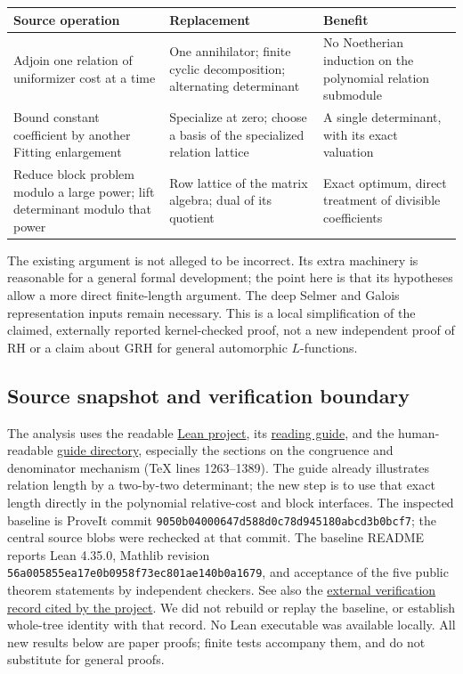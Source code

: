 \documentclass[11pt]{article}
\theoremstyle{remark}\newtheorem{remark}[theorem]{Remark}
\newcommand{\baseurl}{https://github.com/VladimirReshetnikov/ProveIt/tree/9050b04000647d588d0c78d945180abcd3b0bcf7/Analysis/GeneralizedRiemannHypothesis}
\begin{document}
\begin{center}
\begin{tabular}{@{}p{.30\linewidth}p{.32\linewidth}p{.29\linewidth}@{}}
\toprule
Source operation & Replacement & Benefit\\\midrule
Adjoin one relation of uniformizer cost at a time & One annihilator; finite cyclic decomposition; alternating determinant & No Noetherian induction on the polynomial relation submodule\\[3pt]
Bound constant coefficient by another Fitting enlargement & Specialize at zero; choose a basis of the specialized relation lattice & A single determinant, with its exact valuation\\[3pt]
Reduce block problem modulo a large power; lift determinant modulo that power & Row lattice of the matrix algebra; dual of its quotient & Exact optimum, direct treatment of divisible coefficients\\\bottomrule
\end{tabular}
\end{center}
The existing argument is not alleged to be incorrect. Its extra machinery is reasonable for a general formal development; the point here is that its hypotheses allow a more direct finite-length argument. The deep Selmer and Galois representation inputs remain necessary. This is a local simplification of the claimed, externally reported kernel-checked proof, not a new independent proof of RH or a claim about GRH for general automorphic $L$-functions.

\subsection{Source snapshot and verification boundary}
The analysis uses the readable \href{\baseurl/Lean/grh}{Lean project}, its \href{\baseurl/Lean/grh/GUIDE.md}{reading guide}, and the human-readable \href{\baseurl/docs/guide}{guide directory}, especially the sections on the congruence and denominator mechanism (TeX lines 1263--1389). The guide already illustrates relation length by a two-by-two determinant; the new step is to use that exact length directly in the polynomial relative-cost and block interfaces. The inspected baseline is ProveIt commit \texttt{9050b04000647d588d0c78d945180abcd3b0bcf7}; the central source blobs were rechecked at that commit. The baseline README reports Lean 4.35.0, Mathlib revision \texttt{56a005855ea17e0b0958f73ec801ae140b0a1679}, and acceptance of the five public theorem statements by independent checkers. See also the \href{https://math.mit.edu/~drew/shortgrh/}{external verification record cited by the project}. We did not rebuild or replay the baseline, or establish whole-tree identity with that record. No Lean executable was available locally. All new results below are paper proofs; finite tests accompany them, and do not substitute for general proofs.
\end{document}
